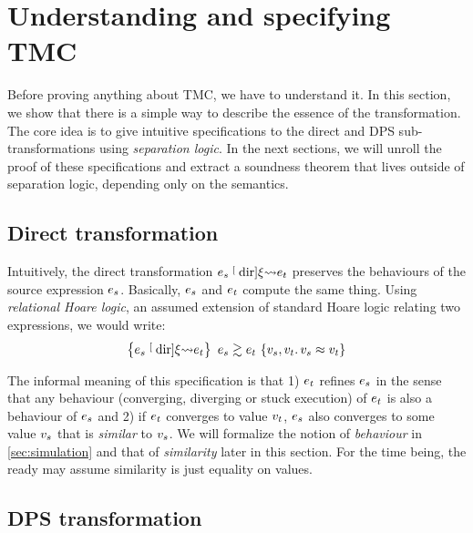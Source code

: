 \section{Understanding and specifying TMC}
\label{sec:specification}

Before proving anything about TMC, we have to understand it.
In this section, we show that there is a simple way to describe the essence of the transformation.
The core idea is to give intuitive specifications to the direct and DPS sub-transformations using \emph{separation logic}.
In the next sections, we will unroll the proof of these specifications and extract a soundness theorem that lives outside of separation logic, depending only on the \DataLang semantics.

\subsection{Direct transformation}

Intuitively, the direct transformation $\datalangExpr_s \tmcDir{\datalangRenaming} \datalangExpr_t$ preserves the behaviours of the source expression $\datalangExpr_s$.
Basically, $\datalangExpr_s$ and $\datalangExpr_t$ compute the same thing.
Using \emph{relational Hoare logic}, an assumed extension of standard Hoare logic relating two expressions, we would write:
\[
    \iSimvHoare{
        \datalangExpr_s \tmcDir{\datalangRenaming} \datalangExpr_t
    }{
        \datalangVal_s, \datalangVal_t \ldotp
        \datalangVal_s \iSimilar \datalangVal_t
    }{
        \datalangExpr_s
    }{
        \datalangExpr_t
    }
\]

The informal meaning of this specification is that 1) $\datalangExpr_t$ refines $\datalangExpr_s$ in the sense that any behaviour (converging, diverging or stuck execution) of $\datalangExpr_t$ is also a behaviour of $\datalangExpr_s$ and 2) if $\datalangExpr_t$ converges to value $\datalangVal_t$, $\datalangExpr_s$ also converges to some value $\datalangVal_s$ that is \emph{similar} to $\datalangVal_s$.
We will formalize the notion of \emph{behaviour} in \cref{sec:simulation} and that of \emph{similarity} later in this section.
For the time being, the ready may assume similarity is just equality on values.

\subsection{DPS transformation}

